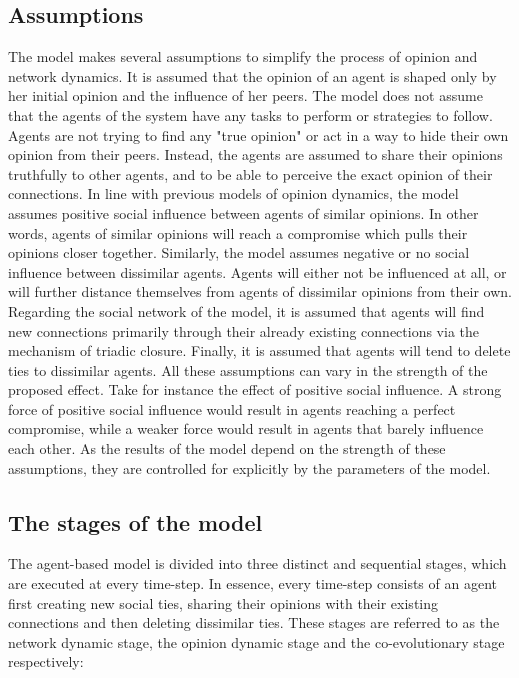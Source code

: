 \documentclass[11pt]{article}
\begin{document}
\subsection{Assumptions}
The model makes several assumptions to simplify the process of opinion and network dynamics. It is assumed that the opinion of an agent is shaped only by her initial opinion and the influence of her peers. 
The model does not assume that the agents of the system have any tasks to perform or strategies to follow. Agents are not trying to find any "true opinion" or act in a way to hide their own opinion from their peers. Instead, the agents are assumed to share their opinions truthfully to other agents, and to be able to perceive the exact opinion of their connections. 
In line with previous models of opinion dynamics, the model assumes positive social influence between agents of similar opinions. In other words, agents of similar opinions will reach a compromise which pulls their opinions closer together. Similarly, the model assumes negative or no social influence between dissimilar agents. Agents will either not be influenced at all, or will further distance themselves from agents of dissimilar opinions from their own. Regarding the social network of the model, it is assumed that agents will find new connections primarily through their already existing connections via the mechanism of triadic closure. Finally, it is assumed that agents will tend to delete ties to dissimilar agents.
All these assumptions can vary in the strength of the proposed effect. Take for instance the effect of positive social influence. A strong force of positive social influence would result in agents reaching a perfect compromise, while a weaker force would result in agents that barely influence each other. 
As the results of the model depend on the strength of these assumptions, they are controlled for explicitly by the parameters of the model. 

\subsection{The stages of the model}
The agent-based model is divided into three distinct and sequential stages, which are executed at every time-step.
In essence, every time-step consists of an agent first creating new social ties, sharing their opinions with their existing connections and then deleting dissimilar ties.
These stages are referred to as the network dynamic stage, the opinion dynamic stage and the co-evolutionary stage respectively: 
\end{document}

